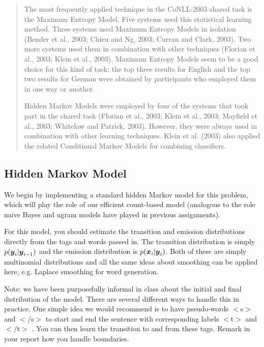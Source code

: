 \documentclass[11pt]{article}
\begin{document}
\begin{quote}
  The most frequently applied technique in the CoNLL-2003 shared task
  is the Maximum Entropy Model. Five systems used this statistical
  learning method. Three systems used Maximum Entropy Models in
  isolation (Bender et al., 2003; Chieu and Ng, 2003; Curran and
  Clark, 2003). Two more systems used them in combination with other
  techniques (Florian et al., 2003; Klein et al., 2003). Maximum
  Entropy Models seem to be a good choice for this kind of task: the
  top three results for English and the top two results for German
  were obtained by participants who employed them in one way or
  another.  
  
  Hidden Markov Models were employed by four of the systems
  that took part in the shared task (Florian et al., 2003; Klein et
  al., 2003; Mayfield et al., 2003; Whitelaw and Patrick,
  2003). However, they were always used in combination with other
  learning techniques. Klein et al. (2003) also applied the related
  Conditional Markov Models for combining classifiers.  
\end{quote}



\subsection{Hidden Markov Model}

We begin by implementing a standard hidden Markov model for this problem,
which will play the role of our efficient count-based model (analogous to the role 
naive Bayes and ngram models have played in previous assignments). 

For this model, you should estimate the transition and emission
distributions directly from the tags and words passed in. The
transition distribution is simply $p(\boldsymbol{y}_i | \boldsymbol{y}_{i-1})$ and the
emission distribution is $p(\boldsymbol{x}_i | \boldsymbol{y}_{i})$. Both of these are
simply multinomial distributions and all the same ideas about smoothing 
can be applied here, e.g. Laplace smoothing for word generation. 

Note: we have been purposefully informal in class about the initial
and final distribution of the model. There are several different ways
to handle this in practice. One simple idea we would recommend is to
have pseudo-words $<$s$>$ and $</$s$>$ to start and end the sentence
with corresponding labels $<$t$>$ and $</$t$>$ . You can then learn
the transition to and from these tags.  Remark in your report how you
handle boundaries.
\end{document}
